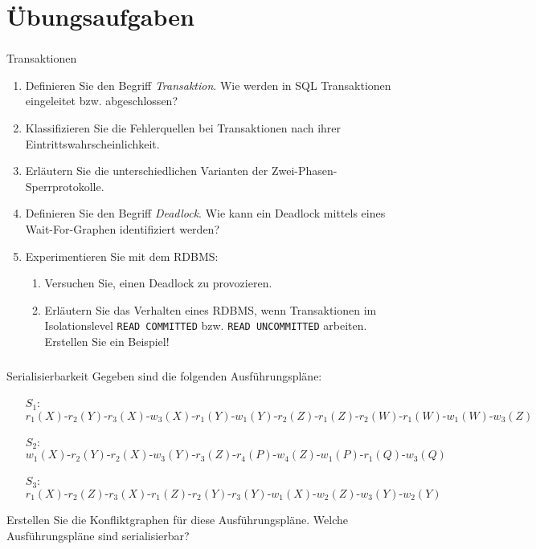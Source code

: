 \section*{Übungsaufgaben}

\begin{frame}[t]
	\frametitle{\insertsection}	
	\begin{alertblock}{Transaktionen}
		\begin{enumerate}
			\item Definieren Sie den Begriff \textit{Transaktion}. Wie werden in SQL Transaktionen eingeleitet bzw. abgeschlossen?
			\item Klassifizieren Sie die Fehlerquellen bei Transaktionen nach ihrer Eintrittswahrscheinlichkeit.
			\item Erläutern Sie die unterschiedlichen Varianten der Zwei-Phasen-Sperrprotokolle.
			\item Definieren Sie den Begriff \textit{Deadlock}. Wie kann ein Deadlock mittels eines Wait-For-Graphen identifiziert werden?
			\item Experimentieren Sie mit dem RDBMS: 
			\begin{enumerate}
				\item Versuchen Sie, einen Deadlock zu provozieren.
				\item Erläutern Sie das Verhalten eines RDBMS, wenn Transaktionen im Isolationslevel \texttt{READ COMMITTED} bzw. \texttt{READ UNCOMMITTED} arbeiten. Erstellen Sie ein Beispiel!
			\end{enumerate}		
		\end{enumerate}
	\end{alertblock}
\end{frame}

\begin{frame}[t]
	\frametitle{\insertsection}	
	\begin{alertblock}{Serialisierbarkeit}
		Gegeben sind die folgenden Ausführungspläne: 
		\begin{itemize}
			\item[$S_1$:] $r_1(X)\text{-} r_2(Y)\text{-} r_3(X)\text{-} w_3(X)\text{-} r_1(Y)\text{-} w_1(Y)\text{-} r_2(Z)\text{-} r_1(Z)\text{-} r_2(W)\text{-} r_1(W)\text{-} w_1(W)\text{-} w_3(Z)$
			\item[$S_2$:] $w_1(X)\text{-} r_2(Y)\text{-} r_2(X) \text{-}w_3(Y)\text{-} r_3(Z)\text{-} r_4(P)\text{-} w_4(Z)\text{-} w_1(P)\text{-} r_1(Q)\text{-} w_3(Q)$
			\item[$S_3$:] $r_1(X)\text{-} r_2(Z)\text{-} r_3(X)\text{-} r_1(Z)\text{-} r_2(Y)\text{-} r_3(Y)\text{-} w_1(X)\text{-} w_2(Z)\text{-} w_3(Y)\text{-} w_2(Y)$		
		\end{itemize}
	Erstellen Sie die Konfliktgraphen f\"ur diese Ausf\"uhrungspl\"ane. 
	\nl
	Welche Ausf\"uhrungspl\"ane sind serialisierbar?					
	\end{alertblock}
\end{frame}
